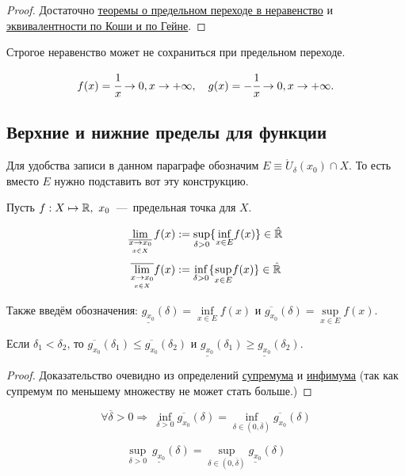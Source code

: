 \begin{proof}
    Достаточно \hyperlink{thm2.3}{теоремы о предельном переходе в неравенство} и \hyperlink{thm4.3}{эквивалентности по Коши и по Гейне}.
\end{proof}

\begin{note}
    Строгое неравенство может не сохраниться при предельном переходе.
\end{note}
\begin{example}
    $$f(x) = \cfrac{1}{x} \to 0, x\to +\infty, \quad g(x) = -\cfrac{1}{x} \to 0, x\to +\infty.$$
\end{example}

\subsection{Верхние и нижние пределы для функции}

Для удобства записи в данном параграфе обозначим $E \equiv    \mathring{U}_{\delta} (x_{0}) \cap X$. То есть вместо $E$ нужно подставить вот эту конструкцию.
\begin{definition}
    Пусть  $f: X \mapsto \mathbb{R},\  x_{0}$~---~предельная точка для $X$. 
   
    $$ \lim\limits_{\overline{\underset{x \in X}{x\to x_0}}} f(x) := \underset{\delta > 0}{\sup}\{ \underset{x\in E}{\inf} f(x)\} \in \Hat{\mathbb{R}} $$
    $$ \overline{\lim\limits_{\underset{x \in X}{x\to x_0}}} f(x) := \underset{\delta > 0}{\inf}\{ \underset{x\in E}{\sup} f(x) \} \in \Hat{\mathbb{R}}$$

    Также введём обозначения: $\underline{g_{x_{0}}} (\delta) = \underset{x\in E}{\inf} f (x)$ и $\overline{g_{x_{0}}} (\delta) = \underset{x\in E}{\sup} f (x).$
    
\end{definition}

\begin{lemma}
     Если $\delta_{1} <\delta_{2}$, то $\overline{g_{x_{0}}}(\delta_{1}) \leq \overline{g_{x_{0}}} (\delta_{2})$ и $\underline{g_{x_{0}}}(\delta_{1}) \geq \underline{g_{x_{0}}} (\delta_{2})$.
\end{lemma}

\begin{proof}
    Доказательство очевидно из определений \hyperlink{def1.23}{супремума} и \hyperlink{def1.25}{инфимума} (так как супремум по меньшему множеству не может стать больше.)
\end{proof}

\begin{lemma}
    \hypertarget{lemm4.6}{}
    $$\forall \overline{\delta} > 0 \Rightarrow \ \underset{\delta > 0}{\inf} \overline{g_{x_{0}}}(\delta) = \underset{\delta \in (0, \overline{\delta}) }{\inf} \overline{g_{x_{0}}}(\delta)$$

    $$\underset{\delta > 0}{\sup}\  \underline{g_{x_{0}}}(\delta) = \underset{\delta \in (0, \overline{\delta}) }{\sup} \underline{g_{x_{0}}}(\delta)$$
\end{lemma}

